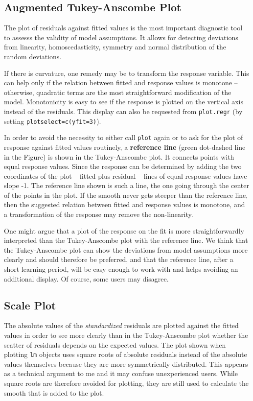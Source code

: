\documentclass[11pt]{article}
\providecommand{\T}{\texttt}
\providecommand{\ul}{\textbf}
\begin{document}
\subsection{Augmented Tukey-Anscombe Plot}
The plot of residuals against fitted values is the most important
diagnostic tool to assesss the validity of model assumptions.
It allows for detecting deviations from linearity, homoscedasticity,
symmetry and normal distribution of the random deviations.

If there is curvature, one remedy may be to transform the response
variable. This can help only if the relation between fitted and
response values is monotone -- otherwise, quadratic terms are the
most straightforward modification of the model.
Monotonicity is easy to see if the response is plotted on the vertical
axis instead of the residuals.
This display can also be requested from \T{plot.regr}
(by setting \T{plotselect=c(yfit=3)}).

In order to avoid the necessity to either call \T{plot} again or to 
ask for the plot of response against fitted values routinely,
a \ul{reference line} (green dot-dashed line in the Figure)
is shown in the Tukey-Anscombe plot.
It connects points with equal response values. Since the response can be
determined by adding the two coordinates of the plot -- 
fitted plus residual -- lines of equal response values have slope -1.
The reference line shown is such a line, the one going through the center
of the points in the plot.
If the smooth never gets steeper than the reference line, then the
suggested relation between fitted and response values is monotone, and a
transformation of the response may remove the non-linearity.

One might argue that a plot of the response on the fit is more
straightforwardly interpreted than the Tukey-Anscombe plot with the
reference line. We think that the Tukey-Anscombe plot can show the
deviations from model assumptions more clearly and should therefore be
preferred, and that the reference line, after a short learning period, will
be easy enough to work with and helps avoiding an additional display. 
Of course, some users may disagree.

\subsection{Scale Plot}
The absolute values of the \emph{standardized} residuals are plotted
against the fitted values 
in order to see more clearly than in the Tukey-Anscombe plot whether the 
scatter of residuals depends on the expected values.
The plot shown when plotting \T{lm} objects uses square roots of absolute
residuals instead of the absolute values themselves because they are more
symmetrically distributed. This appears as a technical argument to me and
it may confuse unexperienced users. While square roots are therefore
avoided for plotting, they are still used to calculate the smooth that is
added to the plot.
\end{document}
